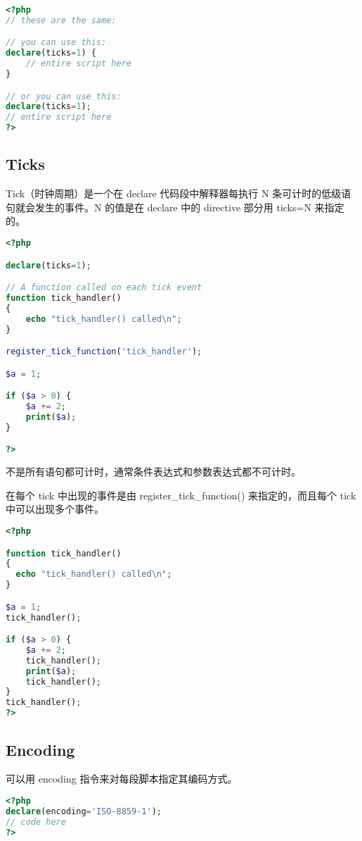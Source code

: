 \begin{lstlisting}[language=PHP]
<?php
// these are the same:

// you can use this:
declare(ticks=1) {
    // entire script here
}

// or you can use this:
declare(ticks=1);
// entire script here
?>
\end{lstlisting}

\subsection{Ticks}

Tick（时钟周期）是一个在 declare 代码段中解释器每执行 N 条可计时的低级语句就会发生的事件。N 的值是在 declare 中的 directive 部分用 ticks=N 来指定的。

\begin{lstlisting}[language=PHP]
<?php

declare(ticks=1);

// A function called on each tick event
function tick_handler()
{
    echo "tick_handler() called\n";
}

register_tick_function('tick_handler');

$a = 1;

if ($a > 0) {
    $a += 2;
    print($a);
}

?>
\end{lstlisting}

不是所有语句都可计时，通常条件表达式和参数表达式都不可计时。

在每个 tick 中出现的事件是由 register\_tick\_function() 来指定的，而且每个 tick 中可以出现多个事件。

\begin{lstlisting}[language=PHP]
<?php

function tick_handler()
{
  echo "tick_handler() called\n";
}

$a = 1;
tick_handler();

if ($a > 0) {
    $a += 2;
    tick_handler();
    print($a);
    tick_handler();
}
tick_handler();
?>
\end{lstlisting}

\subsection{Encoding}

可以用 encoding 指令来对每段脚本指定其编码方式。


\begin{lstlisting}[language=PHP]
<?php
declare(encoding='ISO-8859-1');
// code here
?>
\end{lstlisting}



